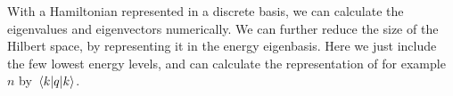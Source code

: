 With a Hamiltonian represented in a discrete basis, we can calculate the eigenvalues and eigenvectors numerically. We can further reduce the size of the Hilbert space, by representing it in the energy eigenbasis. Here we just include the few lowest energy levels, and can calculate the representation of for example $n$ by $\mel{k}{q}{k}$. %














